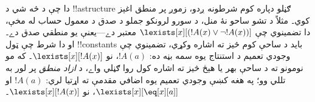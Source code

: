 \documentclass[../../../include/open-logic-section]{subfiles}
\begin{document}
\begin{digress}
دا چې د څه شي د !!a{structure} ګڼلو دپاره کوم شرطونه ږدو، زموږ پر
منطق اغېز کوي۔ مثلاً د تشو ساحو نۀ منل، د سورو لرونکو جملو د صدق د
معمول حساب له مخې، دا تضمينوي چې
$\lexists[x][(!A(x) \lor \lnot !A(x))]$ معتبر دے---يعنې يو منطقي صدق
دے۔ او دا شرط چې ټول !!{constant}s بايد د ساحې کوم څيز ته اشاره وکړي،
تضمينوي چې وجودي تعميم د استنتاج يوه سمه بڼه ده:
$!A(a)$، نو $\lexists[x][!A(x)]$۔ که مو نومونو ته د ساحې بهر يا هېڅ
څيز ته اشاره کول روا ګڼلي واے، د \emph{ازاد منطق} پر لور به تللي وو؛
په هغه کښې وجودي تعميم يوه اضافي مقدمې ته اړتيا لري:
$!A(a)$ او $\lexists[x][\eq[x][a]]$، نو $\lexists[x][!A(x)]$۔
\end{digress}
\end{document}
